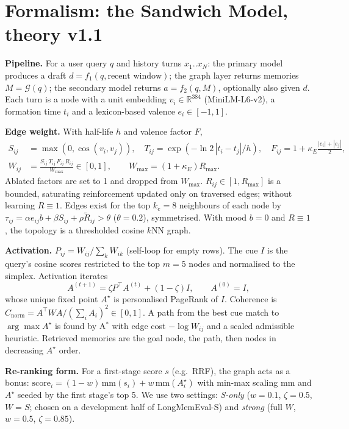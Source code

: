 \documentclass[10pt]{article}
\newcommand{\cn}{C_{\mathrm{norm}}}
\begin{document}
\section{Formalism: the Sandwich Model, theory v1.1}\label{sec:formalism}
\textbf{Pipeline.} For a user query $q$ and history turns $x_1..x_N$: the primary model produces a draft $d=f_1(q,\text{recent window})$; the graph layer returns memories $M=\mathcal G(q)$; the secondary model returns $a=f_2(q,M)$, optionally also given $d$. Each turn is a node with a unit embedding $v_i\in\mathbb R^{384}$ (MiniLM-L6-v2), a formation time $t_i$ and a lexicon-based valence $e_i\in[-1,1]$.

\textbf{Edge weight.} With half-life $h$ and valence factor $F$,
\begin{align}
S_{ij}&=\max(0,\cos(v_i,v_j)), \quad T_{ij}=\exp(-\ln 2\,|t_i-t_j|/h), \quad F_{ij}=1+\kappa_E\tfrac{|e_i|+|e_j|}{2},\\
W_{ij}&=\frac{S_{ij}\,T_{ij}\,F_{ij}\,R_{ij}}{W_{\max}}\in[0,1],\qquad W_{\max}=(1+\kappa_E)R_{\max}.
\end{align}
Ablated factors are set to 1 and dropped from $W_{\max}$. $R_{ij}\in[1,R_{\max}]$ is a bounded, saturating reinforcement updated only on traversed edges; without learning $R\equiv1$. Edges exist for the top $k_e=8$ neighbours of each node by $\tau_{ij}=\alpha e_{ij}b+\beta S_{ij}+\rho\tilde R_{ij}>\theta$ ($\theta=0.2$), symmetrised. With mood $b=0$ and $R\equiv 1$, the topology is a thresholded cosine $k$NN graph.

\textbf{Activation.} $P_{ij}=W_{ij}/\sum_k W_{ik}$ (self-loop for empty rows). The cue $I$ is the query's cosine scores restricted to the top $m=5$ nodes and normalised to the simplex. Activation iterates
\begin{equation}
A^{(t+1)}=\zeta P^\top A^{(t)}+(1-\zeta)I,\qquad A^{(0)}=I,
\end{equation}
whose unique fixed point $A^\star$ is personalised PageRank of $I$. Coherence is $\cn=A^\top W A/(\sum_i A_i)^2\in[0,1]$. A path from the best cue match to $\arg\max A^\star$ is found by A$^*$ \cite{hart1968astar} with edge cost $-\log W_{ij}$ and a scaled admissible heuristic. Retrieved memories are the goal node, the path, then nodes in decreasing $A^\star$ order.

\textbf{Re-ranking form.} For a first-stage score $s$ (e.g.\ RRF), the graph acts as a bonus: $\mathrm{score}_i=(1-w)\,\mathrm{mm}(s_i)+w\,\mathrm{mm}(A^\star_i)$ with min-max scaling $\mathrm{mm}$ and $A^\star$ seeded by the first stage's top 5. We use two settings: \emph{S-only} ($w=0.1$, $\zeta=0.5$, $W=S$; chosen on a development half of LongMemEval-S) and \emph{strong} (full $W$, $w=0.5$, $\zeta=0.85$).
\end{document}
